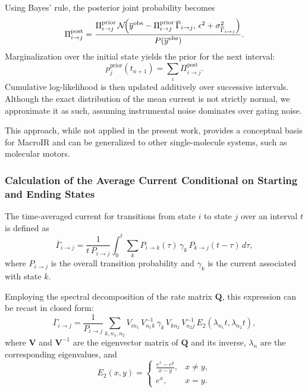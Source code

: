 \documentclass[pdflatex,sn-nature]{sn-jnl}%
\theoremstyle{thmstyleone}%
\theoremstyle{thmstyletwo}%
\theoremstyle{thmstylethree}%
\begin{document}
Using Bayes' rule, the posterior joint probability becomes
\begin{equation}
	\Pi_{i\rightarrow j}^{\text{post}} = \frac{\Pi_{i\rightarrow j}^{\text{prior}}\,\mathcal{N}\!\Bigl(\overline{y}^{\text{obs}} - \Pi_{i\rightarrow j}^{\text{prior}}\,\overline{\Gamma}_{i\rightarrow j},\, \epsilon^2 + \sigma^2_{\overline{\Gamma}_{i\rightarrow j}}\Bigr)}{P(\overline{y}^{\text{obs}})}.
	\label{eq:integrated_posterior_short}
\end{equation}
Marginalization over the initial state yields the prior for the next interval:
\begin{equation}
	p_j^{\text{prior}}(t_{n+1}) = \sum_i \Pi_{i\rightarrow j}^{\text{post}}.
	\label{eq:next_prior_short}
\end{equation}
Cumulative log-likelihood is then updated additively over successive intervals. Although the exact distribution of the mean current is not strictly normal, we approximate it as such, assuming instrumental noise dominates over gating noise.

This approach, while not applied in the present work, provides a conceptual basis for MacroIR and can be generalized to other single-molecule systems, such as molecular motors.


\subsubsection{Calculation of the Average Current Conditional on Starting and Ending States}

The time-averaged current for transitions from state \(i\) to state \(j\) over an interval \(t\) is defined as
\begin{equation}
	\overline{\Gamma}_{i \rightarrow j} = \frac{1}{t\,P_{i\rightarrow j}} \int_0^t \sum_k P_{i\rightarrow k}(\tau)\,\gamma_k\,P_{k\rightarrow j}(t-\tau)\,d\tau,
	\label{eq:gamma_ij_integral_short}
\end{equation}
where \(P_{i\rightarrow j}\) is the overall transition probability and \(\gamma_k\) is the current associated with state \(k\).

Employing the spectral decomposition of the rate matrix \(\mathbf{Q}\), this expression can be recast in closed form:
\begin{equation}
	\overline{\Gamma}_{i \rightarrow j} = \frac{1}{P_{i\rightarrow j}} \sum_{k, n_1, n_2} V_{i n_1}\,V^{-1}_{n_1 k}\,\gamma_k\,V_{k n_2}\,V^{-1}_{n_2 j}\,E_2(\lambda_{n_1}t,\lambda_{n_2}t),
	\label{eq:gamma_ij_formula_short}
\end{equation}
where \(\mathbf{V}\) and \(\mathbf{V}^{-1}\) are the eigenvector matrix of \(\mathbf{Q}\) and its inverse, \(\lambda_{n}\) are the corresponding eigenvalues, and
\begin{equation}
	E_2(x,y)=
	\begin{cases}
		\frac{e^x-e^y}{x-y}, & x\neq y, \\
		e^x, & x=y.
	\end{cases}
	\label{eq:E2_short}
\end{equation}
\end{document}
